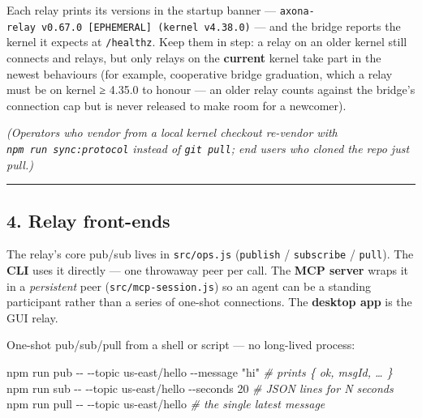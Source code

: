 \documentclass[
  nobib]{tufte-handout}
\newenvironment{Shaded}{}{}
\newcommand{\AttributeTok}[1]{\textcolor[rgb]{0.49,0.56,0.16}{#1}}
\newcommand{\CommentTok}[1]{\textcolor[rgb]{0.38,0.63,0.69}{\textit{#1}}}
\newcommand{\ExtensionTok}[1]{#1}
\newcommand{\NormalTok}[1]{#1}
\newcommand{\StringTok}[1]{\textcolor[rgb]{0.25,0.44,0.63}{#1}}
\renewcommand{\subsubsection}[1]{\medskip\par\noindent{\normalsize\bfseries #1}\par\nobreak\smallskip}
\begin{document}
Each relay prints its versions in the startup banner ---
\texttt{axona-relay\ v0.67.0\ {[}EPHEMERAL{]}\ (kernel\ v4.38.0)} ---
and the bridge reports the kernel it expects at \texttt{/healthz}. Keep
them in step: a relay on an older kernel still connects and relays, but
only relays on the \textbf{current} kernel take part in the newest
behaviours (for example, cooperative bridge graduation, which a relay
must be on kernel ≥ 4.35.0 to honour --- an older relay counts against
the bridge's connection cap but is never released to make room for a
newcomer).

\emph{(Operators who vendor from a local kernel checkout re-vendor with
\texttt{npm\ run\ sync:protocol} instead of \texttt{git\ pull}; end
users who cloned the repo just pull.)}

\begin{center}\rule{0.5\linewidth}{0.5pt}\end{center}

\subsection{4. Relay front-ends}\label{relay-front-ends}

The relay's core pub/sub lives in \texttt{src/ops.js} (\texttt{publish}
/ \texttt{subscribe} / \texttt{pull}). The \textbf{CLI} uses it directly
--- one throwaway peer per call. The \textbf{MCP server} wraps it in a
\emph{persistent} peer (\texttt{src/mcp-session.js}) so an agent can be
a standing participant rather than a series of one-shot connections. The
\textbf{desktop app} is the GUI relay.

\subsubsection{\texorpdfstring{4a. CLI
(\texttt{axona-cli})}{4a. CLI (axona-cli)}}\label{a.-cli-axona-cli}

One-shot pub/sub/pull from a shell or script --- no long-lived process:

\begin{Shaded}
\begin{Highlighting}[]
\ExtensionTok{npm}\NormalTok{ run pub  }\AttributeTok{{-}{-}} \AttributeTok{{-}{-}topic}\NormalTok{ us{-}east/hello }\AttributeTok{{-}{-}message} \StringTok{"hi"}          \CommentTok{\# prints \{ ok, msgId, … \}}
\ExtensionTok{npm}\NormalTok{ run sub  }\AttributeTok{{-}{-}} \AttributeTok{{-}{-}topic}\NormalTok{ us{-}east/hello }\AttributeTok{{-}{-}seconds}\NormalTok{ 20            }\CommentTok{\# JSON lines for N seconds}
\ExtensionTok{npm}\NormalTok{ run pull }\AttributeTok{{-}{-}} \AttributeTok{{-}{-}topic}\NormalTok{ us{-}east/hello                         }\CommentTok{\# the single latest message}
\end{Highlighting}
\end{Shaded}
\end{document}

